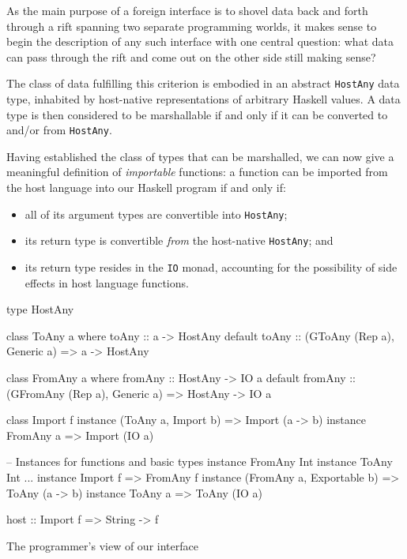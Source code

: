 \documentclass[preprint]{sigplanconf}
\begin{document}
As the main purpose of a foreign interface is to shovel data back and
forth through a rift spanning two separate programming worlds, it makes sense
to begin the description of any such interface with one central question:
what data can pass through the rift and come out on the other side still making
sense?

The class of data fulfilling this criterion is embodied in an
abstract \lstinline!HostAny! data type, inhabited by host-native
representations of arbitrary Haskell values.
A data type is then considered to be marshallable if and only if it can be
converted to and/or from \lstinline!HostAny!.

Having established the class of types that can be marshalled, we can now give
a meaningful definition of \emph{importable} functions: a function can be
imported from the host language into our Haskell program if and only if:
\begin{itemize}
\item
  all of its argument types are convertible into \lstinline!HostAny!;
\item
  its return type is convertible \emph{from} the host-native
  \lstinline!HostAny!; and
\item
  its return type resides in the \lstinline!IO! monad, accounting for the
  possibility of side effects in host language functions.
\end{itemize}

\begin{listingfloat}
\begin{code}
  type HostAny

  class ToAny a where
    toAny :: a -> HostAny
    default toAny :: (GToAny (Rep a), Generic a)
                  => a -> HostAny

  class FromAny a where
    fromAny :: HostAny -> IO a
    default fromAny :: (GFromAny (Rep a), Generic a)
                    => HostAny -> IO a

  class Import f
  instance (ToAny a, Import b) => Import (a -> b)
  instance FromAny a           => Import (IO a)

  -- Instances for functions and basic types
  instance FromAny Int
  instance ToAny Int
  ...
  instance Import f => FromAny f
  instance (FromAny a, Exportable b) => ToAny (a -> b)
  instance ToAny a => ToAny (IO a)

  host :: Import f => String -> f
\end{code}
\caption{The programmer's view of our interface}
\label{lst:interface}
\end{listingfloat}
\end{document}
